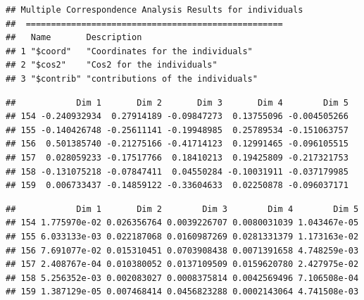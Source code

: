 \documentclass[11pt,]{article}
\newenvironment{Shaded}{\begin{snugshade}}{\end{snugshade}}
\newcommand{\KeywordTok}[1]{\textcolor[rgb]{0.13,0.29,0.53}{\textbf{#1}}}
\newcommand{\NormalTok}[1]{#1}
\newcommand{\OperatorTok}[1]{\textcolor[rgb]{0.81,0.36,0.00}{\textbf{#1}}}
\begin{document}
\begin{verbatim}
## Multiple Correspondence Analysis Results for individuals
##  ===================================================
##   Name       Description                       
## 1 "$coord"   "Coordinates for the individuals" 
## 2 "$cos2"    "Cos2 for the individuals"        
## 3 "$contrib" "contributions of the individuals"
\end{verbatim}

\begin{Shaded}
\end{Shaded}

\begin{verbatim}
##            Dim 1       Dim 2       Dim 3       Dim 4        Dim 5
## 154 -0.240932934  0.27914189 -0.09847273  0.13755096 -0.004505266
## 155 -0.140426748 -0.25611141 -0.19948985  0.25789534 -0.151063757
## 156  0.501385740 -0.21275166 -0.41714123  0.12991465 -0.096105515
## 157  0.028059233 -0.17517766  0.18410213  0.19425809 -0.217321753
## 158 -0.131075218 -0.07847411  0.04550284 -0.10031911 -0.037179985
## 159  0.006733437 -0.14859122 -0.33604633  0.02250878 -0.096037171
\end{verbatim}

\begin{Shaded}
\end{Shaded}

\begin{verbatim}
##            Dim 1       Dim 2        Dim 3        Dim 4        Dim 5
## 154 1.775970e-02 0.026356764 0.0039226707 0.0080031039 1.043467e-05
## 155 6.033133e-03 0.022187068 0.0160987269 0.0281331379 1.173163e-02
## 156 7.691077e-02 0.015310451 0.0703908438 0.0071391658 4.748259e-03
## 157 2.408767e-04 0.010380052 0.0137109509 0.0159620780 2.427975e-02
## 158 5.256352e-03 0.002083027 0.0008375814 0.0042569496 7.106508e-04
## 159 1.387129e-05 0.007468414 0.0456823288 0.0002143064 4.741508e-03
\end{verbatim}

\begin{Shaded}
\end{Shaded}
\end{document}
